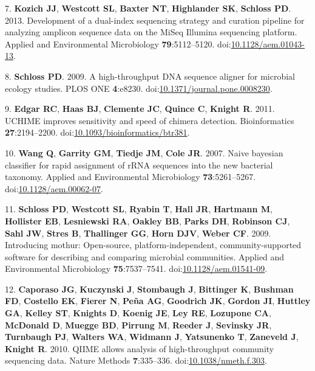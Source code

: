 \documentclass[11pt,]{article}
\begin{document}
\hypertarget{ref-Kozich2013}{}
7. \textbf{Kozich JJ}, \textbf{Westcott SL}, \textbf{Baxter NT},
\textbf{Highlander SK}, \textbf{Schloss PD}. 2013. Development of a
dual-index sequencing strategy and curation pipeline for analyzing
amplicon sequence data on the MiSeq Illumina sequencing platform.
Applied and Environmental Microbiology \textbf{79}:5112--5120.
doi:\href{https://doi.org/10.1128/aem.01043-13}{10.1128/aem.01043-13}.

\hypertarget{ref-Schloss2009a}{}
8. \textbf{Schloss PD}. 2009. A high-throughput DNA sequence aligner for
microbial ecology studies. PLOS ONE \textbf{4}:e8230.
doi:\href{https://doi.org/10.1371/journal.pone.0008230}{10.1371/journal.pone.0008230}.

\hypertarget{ref-Edgar2011}{}
9. \textbf{Edgar RC}, \textbf{Haas BJ}, \textbf{Clemente JC},
\textbf{Quince C}, \textbf{Knight R}. 2011. UCHIME improves sensitivity
and speed of chimera detection. Bioinformatics \textbf{27}:2194--2200.
doi:\href{https://doi.org/10.1093/bioinformatics/btr381}{10.1093/bioinformatics/btr381}.

\hypertarget{ref-Wang2007}{}
10. \textbf{Wang Q}, \textbf{Garrity GM}, \textbf{Tiedje JM},
\textbf{Cole JR}. 2007. Naive bayesian classifier for rapid assignment
of rRNA sequences into the new bacterial taxonomy. Applied and
Environmental Microbiology \textbf{73}:5261--5267.
doi:\href{https://doi.org/10.1128/aem.00062-07}{10.1128/aem.00062-07}.

\hypertarget{ref-Schloss2009b}{}
11. \textbf{Schloss PD}, \textbf{Westcott SL}, \textbf{Ryabin T},
\textbf{Hall JR}, \textbf{Hartmann M}, \textbf{Hollister EB},
\textbf{Lesniewski RA}, \textbf{Oakley BB}, \textbf{Parks DH},
\textbf{Robinson CJ}, \textbf{Sahl JW}, \textbf{Stres B},
\textbf{Thallinger GG}, \textbf{Horn DJV}, \textbf{Weber CF}. 2009.
Introducing mothur: Open-source, platform-independent,
community-supported software for describing and comparing microbial
communities. Applied and Environmental Microbiology
\textbf{75}:7537--7541.
doi:\href{https://doi.org/10.1128/aem.01541-09}{10.1128/aem.01541-09}.

\hypertarget{ref-Caporaso2010}{}
12. \textbf{Caporaso JG}, \textbf{Kuczynski J}, \textbf{Stombaugh J},
\textbf{Bittinger K}, \textbf{Bushman FD}, \textbf{Costello EK},
\textbf{Fierer N}, \textbf{Peña AG}, \textbf{Goodrich JK},
\textbf{Gordon JI}, \textbf{Huttley GA}, \textbf{Kelley ST},
\textbf{Knights D}, \textbf{Koenig JE}, \textbf{Ley RE},
\textbf{Lozupone CA}, \textbf{McDonald D}, \textbf{Muegge BD},
\textbf{Pirrung M}, \textbf{Reeder J}, \textbf{Sevinsky JR},
\textbf{Turnbaugh PJ}, \textbf{Walters WA}, \textbf{Widmann J},
\textbf{Yatsunenko T}, \textbf{Zaneveld J}, \textbf{Knight R}. 2010.
QIIME allows analysis of high-throughput community sequencing data.
Nature Methods \textbf{7}:335--336.
doi:\href{https://doi.org/10.1038/nmeth.f.303}{10.1038/nmeth.f.303}.
\end{document}
